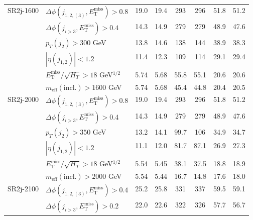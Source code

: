 \documentclass[10pt,fleqn]{article}
\newcommand{\met}{E^\mathrm{miss}_\mathrm{T}}
\newcommand{\meff}{m_\mathrm{eff}}
\begin{document}
\begin{table}[h!]
\begin{tabular}{c|l|c|c|c|c|c|c}
SR2j-1600    & $\Delta\phi(j_{1,2,(3)},\met) > 0.8$            &     19.0   &   19.4    &  293       &   296     &      51.8    &   51.2         \\
             & $\Delta\phi(j_{i>3},\met) > 0.4$                &     14.3   &   14.9    &  279       &   279     &      48.9    &   47.6         \\
             & $p_T(j_2) > 300$ GeV                            &     13.8   &   14.6    &  138       &   144     &      38.9    &   38.3         \\      
             & $|\eta(j_{1,2})|< 1.2$                          &     11.4   &   12.3    &  109       &   114     &      29.1    &   29.4         \\                   
             & $\met/\sqrt{H_T} > 18$ GeV$^{1/2}$              &     5.74   &   5.68    &  55.8      &   55.1    &      20.6    &   20.6         \\    
             & $\meff(\mathrm{incl.}) > 1600$ GeV              &     5.74   &   5.68    &  45.4      &   44.8    &      20.4    &   20.5         \\ \midrule     
SR2j-2000    & $\Delta\phi(j_{1,2,(3)},\met) > 0.8$            &     19.0   &   19.4    &  293       &   296     &      51.8    &   51.2         \\
             & $\Delta\phi(j_{i>3},\met) > 0.4$                &     14.3   &   14.9    &  279       &   279     &      48.9    &   47.6         \\
             & $p_T(j_2) > 350$ GeV                            &     13.2   &   14.1    &  99.7      &   106     &      34.9    &   34.7         \\      
             & $|\eta(j_{1,2})|< 1.2$                          &     11.1   &   12.0    &  81.7      &   87.1    &      26.9    &   27.3         \\                   
             & $\met/\sqrt{H_T} > 18$ GeV$^{1/2}$              &     5.54   &   5.45    &  38.1      &   37.5    &      18.8    &   18.9         \\    
             & $\meff(\mathrm{incl.}) > 2000$ GeV              &     5.54   &   5.44    &  16.7      &   14.8    &      17.6    &   18.0         \\ \midrule          
SR2j-2100    & $\Delta\phi(j_{1,2,(3)},\met) > 0.4$            &     25.2   &   25.8    &  331       &   337     &      59.5    &   59.1         \\
             & $\Delta\phi(j_{i>3},\met) > 0.2$                &     22.0   &   22.6    &  322       &   326     &      57.7    &   56.7         \\

\end{tabular}
\end{table}
\end{document}
